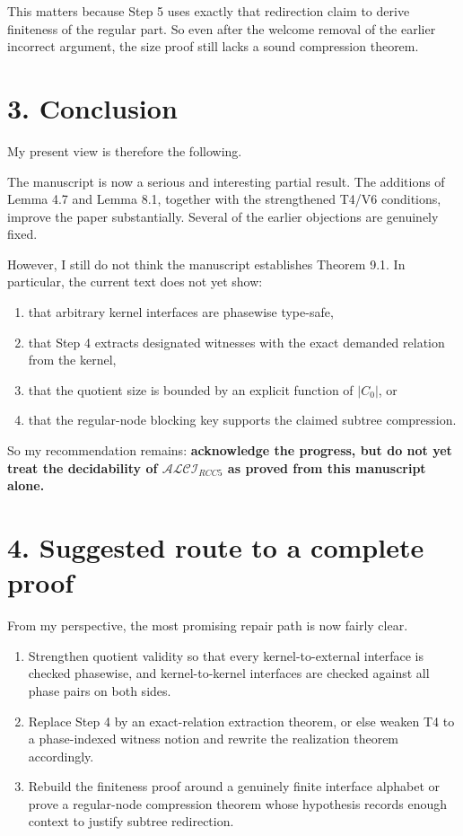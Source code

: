 \documentclass[11pt]{article}
\begin{document}
This matters because Step 5 uses exactly that redirection claim to derive finiteness of the regular part. So even after the welcome removal of the earlier incorrect argument, the size proof still lacks a sound compression theorem.

\section*{3. Conclusion}

My present view is therefore the following.

The manuscript is now a serious and interesting partial result. The additions of Lemma 4.7 and Lemma 8.1, together with the strengthened T4/V6 conditions, improve the paper substantially. Several of the earlier objections are genuinely fixed.

However, I still do not think the manuscript establishes Theorem 9.1. In particular, the current text does not yet show:
\begin{enumerate}[leftmargin=1.5em,itemsep=0.25em]
\item that arbitrary kernel interfaces are phasewise type-safe,
\item that Step 4 extracts designated witnesses with the exact demanded relation from the kernel,
\item that the quotient size is bounded by an explicit function of \(|C_0|\), or
\item that the regular-node blocking key supports the claimed subtree compression.
\end{enumerate}

So my recommendation remains: \textbf{acknowledge the progress, but do not yet treat the decidability of \(\mathcal{ALCI}_{RCC5}\) as proved from this manuscript alone.}

\section*{4. Suggested route to a complete proof}

From my perspective, the most promising repair path is now fairly clear.
\begin{enumerate}[leftmargin=1.5em,itemsep=0.28em]
\item Strengthen quotient validity so that every kernel-to-external interface is checked phasewise, and kernel-to-kernel interfaces are checked against all phase pairs on both sides.
\item Replace Step 4 by an exact-relation extraction theorem, or else weaken T4 to a phase-indexed witness notion and rewrite the realization theorem accordingly.
\item Rebuild the finiteness proof around a genuinely finite interface alphabet or prove a regular-node compression theorem whose hypothesis records enough context to justify subtree redirection.
\end{enumerate}
\end{document}
